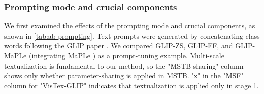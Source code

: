 \documentclass[10pt,twocolumn,letterpaper]{article}
\begin{document}
\subsubsection{Prompting mode and crucial components}
We first examined the effects of the prompting mode and crucial components, as shown in \cref{tab:ab-prompting}. Text prompts were generated by concatenating class words following the GLIP paper \cite{li2022glip}. We compared GLIP-ZS, GLIP-FF, and GLIP-MaPLe (integrating MaPLe \cite{khattak2023pt}) as a prompt-tuning example.  Multi-scale textualization is fundamental to our method, so the "MSTB sharing" column shows only whether parameter-sharing is applied in MSTB. "$\mathsf{x}$" in the "MSF" column for "VisTex-GLIP" indicates that textualization is applied only in stage 1. %
\end{document}

